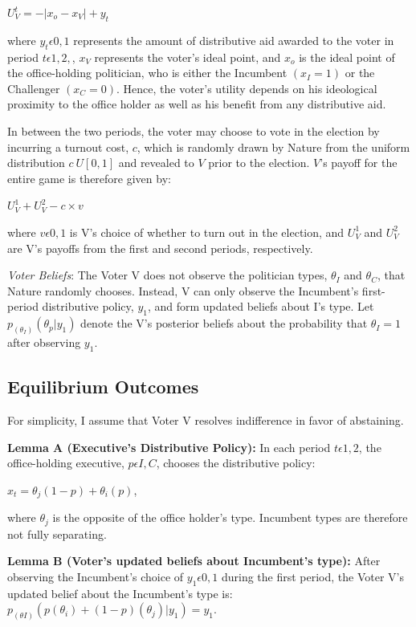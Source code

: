 \documentclass[12pt]{paper}
\begin{document}
$U_{V}^t = -|x_o - x_V| + y_t$

where $y_t\epsilon{0,1}$ represents the amount of distributive aid awarded to the voter in period $t\epsilon{1,2},$, $x_V$ represents the voter’s ideal point, and $x_o$ is the ideal point of the office-holding politician, who is either the Incumbent $(x_I=1)$ or the Challenger $(x_C=0).$ Hence, the voter’s utility depends on his ideological proximity to the office holder as well as his benefit from any distributive aid.

In between the two periods, the voter may choose to vote in the election by incurring a turnout cost, $c$, which is randomly drawn by Nature from the uniform distribution $c~U[0,1]$ and revealed to $V$ prior to the election. $V$’s payoff for the entire game is therefore given by:

$U_{V}^1 + U_{V}^2 - c \times v$

where $v\epsilon{0,1}$ is V’s choice of whether to turn out in the election, and $U_{V}^1$ and $U_{V}^2$ are V’s payoffs from the first and second periods, respectively.

\emph{Voter Beliefs}: The Voter V does not observe the politician types, $\theta_I$ and $\theta_C$, that Nature randomly chooses. Instead, V can only observe the Incumbent's first-period distributive policy,  $y_1$, and form updated beliefs about I’s type. Let $p_(\theta_I ) (\theta_p | y_1 )$ denote the V’s posterior beliefs about the probability that $\theta_I=1$ after observing $y_1$.

\subsection{Equilibrium Outcomes}
For simplicity, I assume that Voter V resolves indifference in favor of abstaining.
	
\textbf{Lemma A (Executive’s Distributive Policy):} In each period $t\epsilon{1,2}$, the office-holding executive, $p\epsilon{I,C}$, chooses the distributive policy: 

$x_t=\theta_j (1-p)+ \theta_i (p)$, 

where $\theta_j$ is the opposite of the office holder’s type. Incumbent types are therefore not fully separating. 


\textbf{Lemma B (Voter’s updated beliefs about Incumbent’s type):}  After observing the Incumbent’s choice of $y_1 \epsilon {0,1}$ during the first period, the Voter V’s updated belief about the Incumbent’s type is: $p_(\theta I) (p(\theta_i ) + (1 - p)(\theta_j ) | y_1 )=y_1$.
\end{document}
